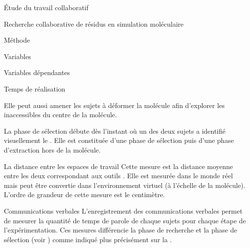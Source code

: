 \documentclass[myfrancais]{mythesis}
\begin{document}
\begin{mypart}{Étude du travail collaboratif}
\begin{mychapter}{Recherche collaborative de résidus en simulation moléculaire}
\begin{mysection}{Méthode}
\begin{mysubsection}{Variables}
\begin{mysubsubsection}{Variables dépendantes}
\begin{myparagraph}{ Temps de réalisation}
\begin{description}
									Elle peut aussi amener les sujets à déformer la molécule afin d'explorer les  inaccessibles du centre de la molécule.
								\item[La sélection] La phase de sélection débute dès l'instant où un des deux sujets a identifié visuellement le .
									Elle est constituée d'une phase de sélection puis d'une phase d'extraction hors de la molécule.
							\end{description}
						\end{myparagraph}
						\begin{myparagraph}{ La distance entre les espaces de travail}
							Cette mesure est la distance moyenne entre les deux  correspondant aux outils .
							Elle est mesurée dans le monde réel mais peut être convertie dans l'environnement virtuel (à l'échelle de la molécule).
							L'ordre de grandeur de cette mesure est le centimètre.
						\end{myparagraph}
						\begin{myparagraph}{ Communications verbales}
							L'enregistrement des communications verbales permet de mesurer la quantité de temps de parole de chaque sujets pour chaque étape de l'expérimentation.
							Ces mesures différencie la phase de recherche et la phase de sélection (voir ) comme indiqué plus précisément sur la .


\end{myparagraph}
\end{mysubsubsection}
\end{mysubsection}
\end{mysection}
\end{mychapter}
\end{mypart}
\end{document}
